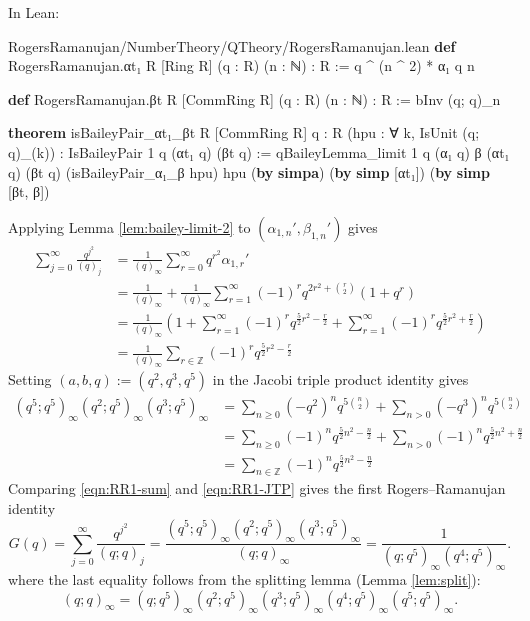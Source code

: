 \documentclass[12pt]{amsart}
\theoremstyle{definition}
\theoremstyle{remark}
\numberwithin{equation}{subsection}
\newcommand{\kw}[1]{\textcolor{keywordcolor}{\textbf{#1}}}
\newcommand{\var}[1]{\textcolor{tacticcolor}{#1}}
\newcommand{\num}[1]{\textcolor{numcolor}{#1}}
\newcommand{\imp}[1]{\textcolor{commentcolor}{\textbraceleft#1\textbraceright}}
\begin{document}
In Lean:

\begin{code}{RogersRamanujan/NumberTheory/QTheory/RogersRamanujan.lean}
\kw{def} RogersRamanujan.αt₁ \imp{R} [Ring \var{R}] (\var{q} : \var{R}) (\var{n} : ℕ) : \var{R} := \var{q} ^ (\var{n} ^ \num{2}) * α₁ \var{q} \var{n}

\kw{def} RogersRamanujan.βt \imp{R} [CommRing \var{R}] (\var{q} : \var{R}) (\var{n} : ℕ) : \var{R} := bInv (\var{q}; \var{q})_\var{n}

\kw{theorem} isBaileyPair_αt₁_βt \imp{R} [CommRing \var{R}] \imp{q : R} (\var{hpu} : ∀ \var{k}, IsUnit (\var{q}; \var{q})_(\var{k})) :
    IsBaileyPair \num{1} \var{q} (αt₁ \var{q}) (βt \var{q}) := 
  qBaileyLemma_limit \num{1} \var{q} (α₁ \var{q}) β (αt₁ \var{q}) (βt \var{q})
    (isBaileyPair_α₁_β \var{hpu}) \var{hpu} (\kw{by} \kw{simpa}) (\kw{by} \kw{simp} [αt₁]) (\kw{by} \kw{simp} [βt, β])
\end{code}
Applying Lemma \ref{lem:bailey-limit-2} to $(\alpha_{1,n}', \beta_{1,n}')$ gives
\begin{align}
    \sum_{j=0}^{\infty} \frac{q^{j^2}}{(q)_j} &= \frac{1}{(q)_\infty} \sum_{r=0}^{\infty} q^{r^2} \alpha_{1,r}' \nonumber \\
    &= \frac{1}{(q)_\infty} + \frac{1}{(q)_\infty} \sum_{r=1}^{\infty} (-1)^r q^{2r^2 + \binom{r}{2}} (1 + q^r) \nonumber \\
    &= \frac{1}{(q)_\infty}\left(1 + \sum_{r=1}^{\infty} (-1)^r q^{\frac{5}{2}r^2 - \frac{r}{2}} + \sum_{r=1}^{\infty} (-1)^r q^{\frac{5}{2}r^2 + \frac{r}{2}}\right) \nonumber \\
    &= \frac{1}{(q)_\infty} \sum_{r \in \mathbb{Z}} (-1)^r q^{\frac{5}{2}r^2 - \frac{r}{2}} \label{eqn:RR1-sum}
\end{align}
Setting $(a, b, q) := (q^2, q^3, q^5)$ in the Jacobi triple product identity gives
\begin{align}
    (q^5;q^5)_\infty (q^2;q^5)_\infty (q^3;q^5)_\infty &= \sum_{n \ge 0} (-q^2)^{n} q^{5\binom{n}{2}} + \sum_{n > 0} (-q^3)^{n} q^{5\binom{n}{2}} \nonumber \\
    &= \sum_{n \ge 0} (-1)^n q^{\frac{5}{2}n^2 - \frac{n}{2}} + \sum_{n > 0} (-1)^n q^{\frac{5}{2}n^2 + \frac{n}{2}} \nonumber \\
    &= \sum_{n \in \mathbb{Z}} (-1)^n q^{\frac{5}{2}n^2 - \frac{n}{2}} \label{eqn:RR1-JTP}
\end{align}
Comparing \eqref{eqn:RR1-sum} and \eqref{eqn:RR1-JTP} gives the first Rogers--Ramanujan identity
\begin{equation}
    G(q) = \sum_{j=0}^{\infty} \frac{q^{j^2}}{(q;q)_j} = \frac{(q^5;q^5)_\infty (q^2;q^5)_\infty (q^3;q^5)_\infty}{(q;q)_\infty} = \frac{1}{(q;q^5)_\infty (q^4;q^5)_\infty}.
\end{equation}
where the last equality follows from the splitting lemma (Lemma \ref{lem:split}):
\begin{equation}
    (q;q)_\infty = (q;q^5)_\infty (q^2;q^5)_\infty (q^3;q^5)_\infty (q^4;q^5)_\infty (q^5;q^5)_\infty. \label{eqn:qpoch_prod5}
\end{equation}
\end{document}
